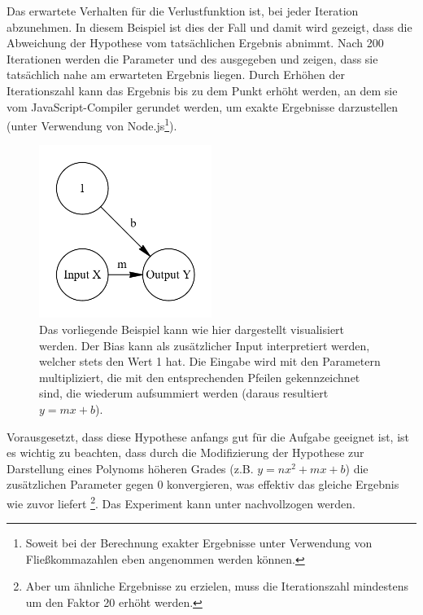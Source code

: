 Das erwartete Verhalten für die Verlustfunktion ist, bei jeder Iteration abzunehmen.
In diesem Beispiel ist dies der Fall und damit wird gezeigt, dass die Abweichung der Hypothese vom tatsächlichen Ergebnis abnimmt.
Nach 200 Iterationen werden die Parameter  und  des  ausgegeben und zeigen, dass sie tatsächlich nahe am erwarteten Ergebnis liegen.
Durch Erhöhen der Iterationszahl kann das Ergebnis bis zu dem Punkt erhöht werden, an dem sie vom JavaScript-Compiler gerundet werden, um exakte Ergebnisse darzustellen (unter Verwendung von Node.js\footnote{ Soweit bei der Berechnung exakter Ergebnisse unter Verwendung von Fließkommazahlen eben angenommen werden können.}).

\begin{figure}
    \centering
    \caption{Das vorliegende Beispiel kann wie hier dargestellt visualisiert werden. Der Bias kann als zusätzlicher Input interpretiert werden, welcher stets den Wert 1 hat. Die Eingabe wird mit den Parametern multipliziert, die mit den entsprechenden Pfeilen gekennzeichnet sind, die wiederum aufsummiert werden (daraus resultiert $y = mx + b$).}
    \includegraphics[width=0.5\textwidth]{images/1_simplest_nn.png}
\end{figure}

Vorausgesetzt, dass diese Hypothese anfangs gut für die Aufgabe geeignet ist, ist es wichtig zu beachten, dass durch die Modifizierung der Hypothese zur Darstellung eines Polynoms höheren Grades (z.B. $y = nx^2 + mx + b$) die zusätzlichen Parameter gegen 0 konvergieren, was effektiv das gleiche Ergebnis wie zuvor liefert \footnote{Aber um ähnliche Ergebnisse zu erzielen, muss die Iterationszahl mindestens um den Faktor 20 erhöht werden.}.
Das Experiment kann unter  nachvollzogen werden.
